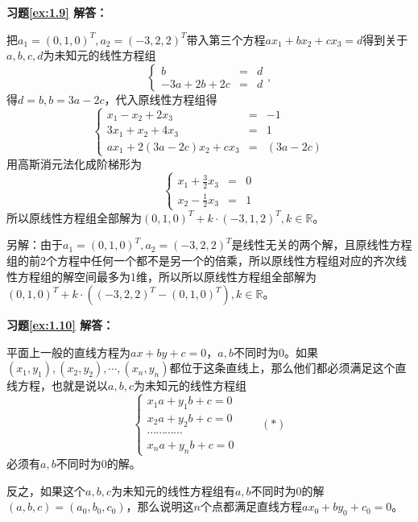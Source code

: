\vspace{1.5em}

\textbf{习题\ref{ex:1.9} 解答：}

把$a_1 = (0,1,0)^T, a_2 = (-3,2,2)^T$带入第三个方程$ax_1 + bx_2 + cx_3 = d$得到关于$a,b,c,d$为未知元的线性方程组
$$\left\{ \begin{array}{rcl} b & = & d \\ -3a + 2b + 2c & = & d\end{array}\right.,$$
得$d = b, b = 3a - 2c$，代入原线性方程组得
$$\left\{ \begin{array}{rcl} x_1 - x_2 + 2x_3 & = & -1 \\ 3x_1 + x_2 + 4x_3 & = & 1 \\ ax_1 + 2(3a - 2c)x_2 + cx_3 & = & (3a - 2c)\end{array}\right.$$
用高斯消元法化成阶梯形为
$$\left\{ \begin{array}{rcl} x_1 + \frac32 x_3 & = & 0 \\ x_2 - \frac12 x_3 & = & 1 \end{array}\right.$$
所以原线性方程组全部解为$(0,1,0)^T + k\cdot(-3,1,2)^T, k\in\mathbb{R}$。

另解：由于$a_1 = (0,1,0)^T, a_2 = (-3,2,2)^T$是线性无关的两个解，且原线性方程组的前2个方程中任何一个都不是另一个的倍乘，所以原线性方程组对应的齐次线性方程组的解空间最多为1维，所以所以原线性方程组全部解为$(0,1,0)^T + k\cdot((-3,2,2)^T - (0,1,0)^T), k\in\mathbb{R}$。

\vspace{1.5em}

\textbf{习题\ref{ex:1.10} 解答：}

平面上一般的直线方程为$ax+by+c=0$，$a,b$不同时为0。如果$(x_1,y_1),(x_2,y_2),\cdots,(x_n,y_n)$都位于这条直线上，那么他们都必须满足这个直线方程，也就是说以$a,b,c$为未知元的线性方程组
$$\begin{cases} x_1a+y_1b+c = 0 \\ x_2a+y_2b+c = 0 \\ \cdots\cdots\cdots\cdots \\ x_na+y_nb+c = 0\end{cases} \qquad (\ast)$$
必须有$a,b$不同时为0的解。

反之，如果这个$a,b,c$为未知元的线性方程组有$a,b$不同时为0的解$(a,b,c) = (a_0,b_0,c_0)$，那么说明这$n$个点都满足直线方程$ax_0+by_0+c_0=0$。

